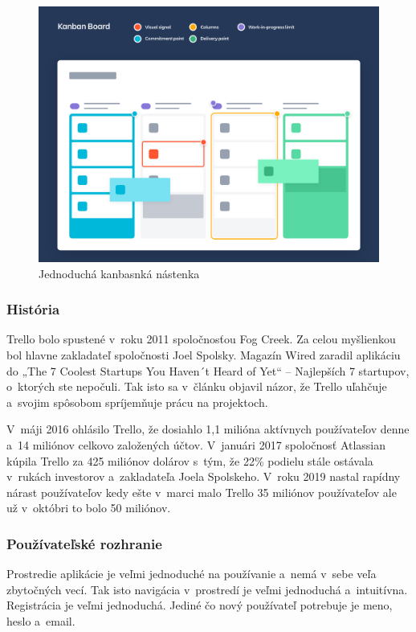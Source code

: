 \begin{figure}[H]
    \centering
    \includegraphics[scale=0.25]{img/obr4.png}
    \caption{Jednoduchá kanbasnká nástenka}
    \label{fig:kab-nas}
\end{figure}

\subsubsection{História}
\indent Trello bolo spustené v roku 2011 spoločnosťou Fog Creek. Za celou myšlienkou bol hlavne zakladateľ spoločnosti Joel Spolsky. Magazín Wired zaradil aplikáciu do „The 7 Coolest Startups You Haven´t Heard of Yet“ – Najlepších 7 startupov, o ktorých ste nepočuli. Tak isto sa v článku objavil názor, že Trello uľahčuje a svojim spôsobom spríjemňuje prácu na projektoch. 

\indent V máji 2016 ohlásilo Trello, že dosiahlo 1,1 milióna aktívnych používateľov denne a 14 miliónov celkovo založených účtov. V januári 2017 spoločnosť Atlassian kúpila Trello za 425 miliónov dolárov s tým, že 22\% podielu stále ostávala v rukách investorov a zakladateľa Joela Spolskeho. V roku 2019 nastal rapídny nárast používateľov kedy ešte v marci malo Trello 35 miliónov používateľov ale už v októbri to bolo 50 miliónov.
\subsubsection{Používateľské rozhranie}
\indent Prostredie aplikácie je veľmi jednoduché na používanie a nemá v sebe veľa zbytočných vecí. Tak isto navigácia v prostredí je veľmi jednoduchá a intuitívna. Registrácia je veľmi jednoduchá. Jediné čo nový používateľ potrebuje je meno, heslo a email. 

